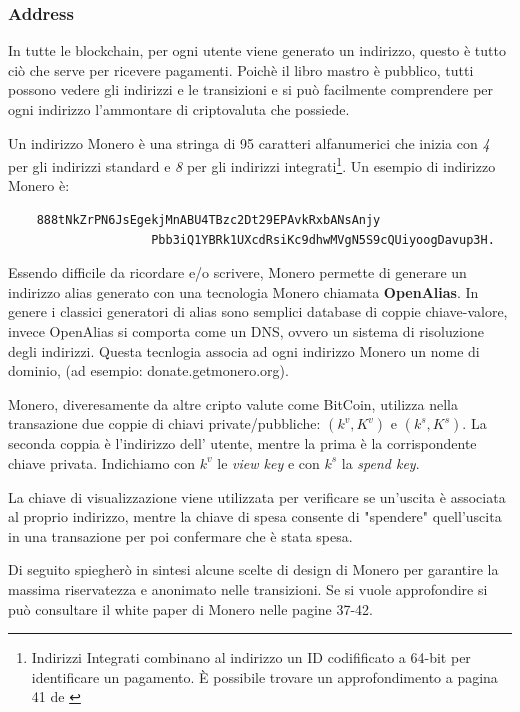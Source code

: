 \documentclass[12pt,a4paper]{article}
\begin{document}
\subsubsection*{Address}
In tutte le blockchain, per ogni utente viene generato un indirizzo, questo è
tutto ciò che serve per ricevere pagamenti. Poichè il libro mastro è pubblico,
tutti possono vedere gli indirizzi e le transizioni e si può facilmente
comprendere per ogni indirizzo l'ammontare di criptovaluta che possiede.

Un indirizzo Monero è una stringa di 95 caratteri alfanumerici che inizia con
\textit{4} per gli indirizzi standard e \textit{8} per gli indirizzi
integrati\footnote{Indirizzi Integrati combinano al indirizzo un ID codifificato
a 64-bit per identificare un pagamento. È possibile trovare un approfondimento a
pagina 41 de \cite{Zero To Monero}}. Un esempio di indirizzo Monero è:

\begin{verbatim}
    888tNkZrPN6JsEgekjMnABU4TBzc2Dt29EPAvkRxbANsAnjy
                    Pbb3iQ1YBRk1UXcdRsiKc9dhwMVgN5S9cQUiyoogDavup3H.
\end{verbatim}

Essendo difficile da ricordare e/o scrivere, Monero permette di generare un
indirizzo alias generato con una tecnologia Monero chiamata \textbf{OpenAlias}.
In genere i classici generatori di alias sono semplici database di coppie
chiave-valore, invece OpenAlias si comporta come un DNS, ovvero un sistema di
risoluzione degli indirizzi. Questa tecnlogia associa ad ogni indirizzo Monero
un nome di dominio, (ad esempio: donate.getmonero.org).

Monero, diveresamente da altre cripto valute come BitCoin, utilizza nella
transazione due coppie di chiavi private/pubbliche: $(k^v, K^v)$ e $(k^s, K^s)$.
La seconda coppia è l'indirizzo dell' utente, mentre la prima è la corrispondente
chiave privata. Indichiamo con $k^v$ le \textit{view key} e con $k^s$ la
\textit{spend key}.

La chiave di visualizzazione viene utilizzata per verificare se un'uscita è
associata al proprio indirizzo, mentre la chiave di spesa consente di "spendere"
quell'uscita in una transazione per poi confermare che è stata spesa.

Di seguito spiegherò in sintesi alcune scelte di design di Monero per garantire
la massima riservatezza e anonimato nelle transizioni. Se si vuole approfondire
si può consultare il white paper di Monero \cite{Zero To Monero} nelle pagine
37-42.
\end{document}
